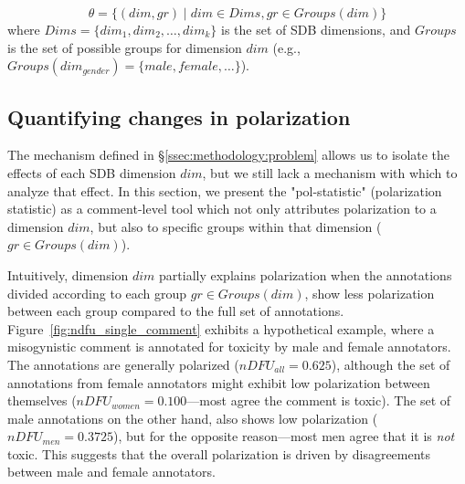 \documentclass{article}
\newcommand{\sdbdim}{\textit{dim}}
\newcommand{\Sdbdim}{\textit{Dims}}
\newcommand{\sdbgroup}{\textit{gr}}
\newcommand{\Sdbgroup}{\textit{Groups}}
\begin{document}
\begin{equation}
    \theta = \{(\sdbdim, \sdbgroup) \mid \sdbdim \in \Sdbdim, \sdbgroup \in \Sdbgroup(\sdbdim)\}
\end{equation} 
\noindent where $\Sdbdim =\{\sdbdim_1, \sdbdim_2, \ldots, \sdbdim_k\}$ is the set of \ac{SDB} dimensions, and $\Sdbgroup$ is the set of possible groups for dimension $\sdbdim$ (e.g., $\Sdbgroup(\sdbdim_{\textit{gender}}) = \{\textit{male}, \textit{female}, \ldots\}$).


\subsection{Quantifying changes in polarization}
\label{ssec:methodology:intuition}

The mechanism defined in \S\ref{ssec:methodology:problem} allows us to isolate the effects of each \ac{SDB} dimension $\sdbdim$, but we still lack a mechanism with which to analyze that effect. In this section, we present the "pol-statistic" (polarization statistic) as a comment-level tool which not only attributes polarization to a dimension $\sdbdim$, but also to specific groups within that dimension ($\sdbgroup \in \Sdbgroup(\sdbdim)$).

Intuitively, dimension $\sdbdim$ partially explains polarization when the annotations divided according to each group $\sdbgroup \in \Sdbgroup(\sdbdim)$, show less polarization between each group compared to the full set of annotations. Figure~\ref{fig:ndfu_single_comment} exhibits a hypothetical example, where a misogynistic comment is annotated for toxicity by male and female annotators. The annotations are generally polarized ($nDFU_{all} = 0.625$), although the set of annotations from female annotators might exhibit low polarization between themselves ($nDFU_{women} = 0.100$---most agree the comment is toxic). The set of male annotations on the other hand, also shows low polarization ($nDFU_{men} = 0.3725$), but for the opposite reason---most men agree that it is \emph{not} toxic. This suggests that the overall polarization is driven by disagreements between male and female annotators. 
\end{document}
